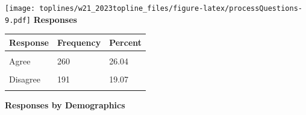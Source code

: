 \documentclass[]{article}
\begin{document}
\texttt{[image: toplines/w21\_2023topline\_files/figure-latex/processQuestions-9.pdf]}
\textbf{Responses}

\begin{tabu} to 
\toprule
Response & Frequency & Percent\\
\midrule
{} &  & \\
Agree & 260 & 26.04\\
 &  & \\
Disagree & 191 & 19.07\\
 &  & \\
\bottomrule
\end{tabu}

\textbf{Responses by Demographics}\begingroup\fontsize{7}{9}\selectfont
\end{document}
